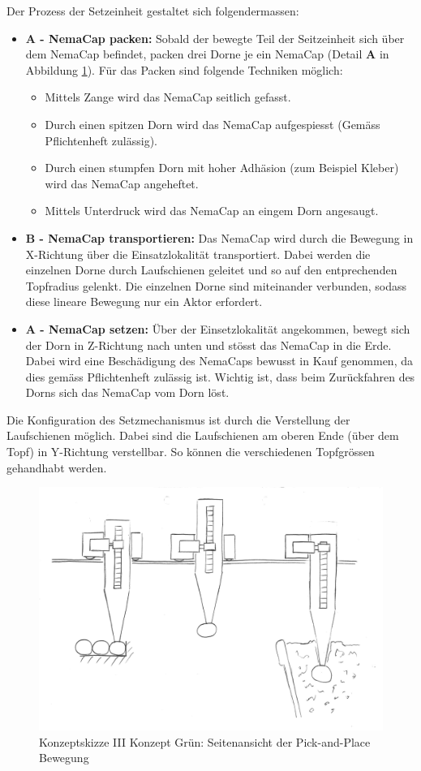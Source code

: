 Der Prozess der Setzeinheit gestaltet sich folgendermassen:
\begin{itemize}
	\item \textbf{A - NemaCap packen:} Sobald der bewegte Teil der Seitzeinheit sich über dem NemaCap befindet, packen drei Dorne je ein NemaCap (Detail \textbf{A} in Abbildung \ref{fig:transport_green_side}). Für das Packen sind folgende Techniken möglich:
	\begin{itemize}
		\item Mittels Zange wird das NemaCap seitlich gefasst.
		\item Durch einen spitzen Dorn wird das NemaCap aufgespiesst (Gemäss Pflichtenheft zulässig).
		\item Durch einen stumpfen Dorn mit hoher Adhäsion (zum Beispiel Kleber) wird das NemaCap angeheftet.
		\item Mittels Unterdruck wird das NemaCap an eingem Dorn angesaugt.
	\end{itemize} 
	\item \textbf{B - NemaCap transportieren:} Das NemaCap wird durch die Bewegung in X-Richtung über die Einsatzlokalität transportiert. Dabei werden die einzelnen Dorne durch Laufschienen geleitet und so auf den entprechenden Topfradius gelenkt. Die einzelnen Dorne sind miteinander verbunden, sodass diese lineare Bewegung nur ein Aktor erfordert.
	\item \textbf{A - NemaCap setzen:} 
	Über der Einsetzlokalität angekommen, bewegt sich der Dorn in Z-Richtung nach unten und stösst das NemaCap in die Erde. Dabei wird eine Beschädigung des NemaCaps bewusst in Kauf genommen, da dies gemäss Pflichtenheft zulässig ist. Wichtig ist, dass beim Zurückfahren des Dorns sich das NemaCap vom Dorn löst.
\end{itemize}
Die Konfiguration des Setzmechanismus ist durch die Verstellung der Laufschienen möglich. Dabei sind die Laufschienen am oberen Ende (über dem Topf) in Y-Richtung verstellbar. So können die verschiedenen Topfgrössen gehandhabt werden.

\begin{figure}[H]
	\includegraphics[scale=0.6]{Illustrationen/5-Konzept/green_2Dmachine_seite.jpg}
	\caption{Konzeptskizze III Konzept Grün: Seitenansicht der Pick-and-Place Bewegung}
	\label{fig:transport_green_side}
\end{figure}